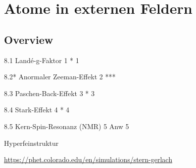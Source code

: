 \renewcommand{\lastmod}{10. September 2024}
\renewcommand{\chapterauthors}{Markus Lippitz}

\chapter{Atome in externen Feldern}






\section{Overview}




8.1 Landé-g-Faktor 1	*	1 

8.2* Anormaler Zeeman-Effekt 2	***

8.3 Paschen-Back-Effekt 3	*	3 

8.4 Stark-Effekt 4	*	4 

8.5 Kern-Spin-Resonanz (NMR) 5	Anw	5 

Hyperfeinstruktur 


\url{https://phet.colorado.edu/en/simulations/stern-gerlach}




\printbibliography[segment=\therefsegment,heading=subbibliography]
